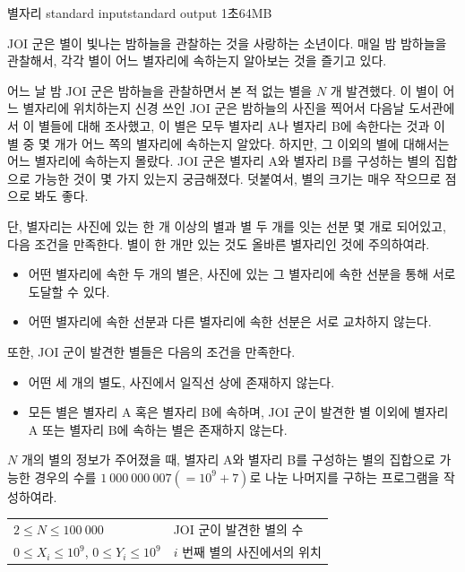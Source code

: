 \begin{problem}{별자리}
	{standard input}{standard output}
	{1초}{64MB}{}
	
	JOI 군은 별이 빛나는 밤하늘을 관찰하는 것을 사랑하는 소년이다. 매일 밤 밤하늘을 관찰해서, 각각 별이 어느 별자리에 속하는지 알아보는 것을 즐기고 있다.
	
	어느 날 밤 JOI 군은 밤하늘을 관찰하면서 본 적 없는 별을 $N$ 개 발견했다. 이 별이 어느 별자리에 위치하는지 신경 쓰인 JOI 군은 밤하늘의 사진을 찍어서 다음날 도서관에서 이 별들에 대해 조사했고, 이 별은 모두 별자리 A나 별자리 B에 속한다는 것과 이 별 중 몇 개가 어느 쪽의 별자리에 속하는지 알았다. 하지만, 그 이외의 별에 대해서는 어느 별자리에 속하는지 몰랐다. JOI 군은 별자리 A와 별자리 B를 구성하는 별의 집합으로 가능한 것이 몇 가지 있는지 궁금해졌다. 덧붙여서, 별의 크기는 매우 작으므로 점으로 봐도 좋다.
	
	단, 별자리는 사진에 있는 한 개 이상의 별과 별 두 개를 잇는 선분 몇 개로 되어있고, 다음 조건을 만족한다. 별이 한 개만 있는 것도 올바른 별자리인 것에 주의하여라.
	
	\begin{itemize}
		\item 어떤 별자리에 속한 두 개의 별은, 사진에 있는 그 별자리에 속한 선분을 통해 서로 도달할 수 있다.
		\item 어떤 별자리에 속한 선분과 다른 별자리에 속한 선분은 서로 교차하지 않는다.
	\end{itemize}
	
	또한, JOI 군이 발견한 별들은 다음의 조건을 만족한다.
	
	\begin{itemize}
		\item 어떤 세 개의 별도, 사진에서 일직선 상에 존재하지 않는다.
		\item 모든 별은 별자리 A 혹은 별자리 B에 속하며, JOI 군이 발견한 별 이외에 별자리 A 또는 별자리 B에 속하는 별은 존재하지 않는다.
	\end{itemize}
	
	$N$ 개의 별의 정보가 주어졌을 때, 별자리 A와 별자리 B를 구성하는 별의 집합으로 가능한 경우의 수를 $1\ 000\ 000\ 007 (=10^9 + 7)$로 나눈 나머지를 구하는 프로그램을 작성하여라.
	
	\Constraints
	
	
	\begin{tabular}{ll}
		$2 \le N \le 100\ 000$ & JOI 군이 발견한 별의 수 \\
		$0 \le X_i \le 10^9$, $0 \le Y_i \le 10^9$  & 	$i$ 번째 별의 사진에서의 위치 \\
	\end{tabular}
	

\end{problem}

